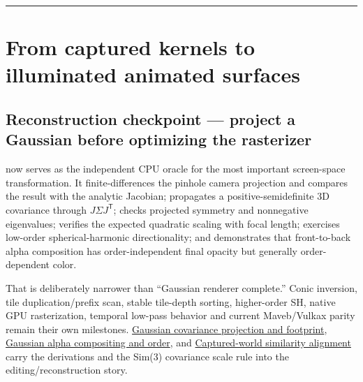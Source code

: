 \begin{center}\rule{0.5\linewidth}{0.5pt}\end{center}

\section{From captured kernels to illuminated animated surfaces}\label{04-visual-computing-ii-ch036-from-captured-kernels-to-illuminated-animated-surfaces}

\hypertarget{04-visual-computing-ii-ch036-from-captured-kernels-to-illuminated-animated-surfaces}{}

\subsection{Reconstruction checkpoint --- project a Gaussian before optimizing the rasterizer}\label{04-visual-computing-ii-ch036-reconstruction-checkpoint-project-a-gaussian-before-optimizing-the-rasterizer}

\hypertarget{04-visual-computing-ii-ch036-reconstruction-checkpoint-project-a-gaussian-before-optimizing-the-rasterizer}{}

 now serves as the independent CPU oracle for the most important screen-space transformation. It finite-differences the pinhole camera projection and compares the result with the analytic Jacobian; propagates a positive-semidefinite 3D covariance through \(J\Sigma J^{\mathsf T}\); checks projected symmetry and nonnegative eigenvalues; verifies the expected quadratic scaling with focal length; exercises low-order spherical-harmonic directionality; and demonstrates that front-to-back alpha composition has order-independent final opacity but generally order-dependent color.

That is deliberately narrower than ``Gaussian renderer complete.'' Conic inversion, tile duplication/prefix scan, stable tile-depth sorting, higher-order SH, native GPU rasterization, temporal low-pass behavior and current Maveb/Vulkax parity remain their own milestones. \hyperref[appendix-24269cb6977c]{Gaussian covariance projection and footprint}, \hyperref[appendix-5f4b2e24c3f6]{Gaussian alpha compositing and order}, and \hyperref[appendix-5f40b4fea463]{Captured-world similarity alignment} carry the derivations and the Sim(3) covariance scale rule into the editing/reconstruction story.

